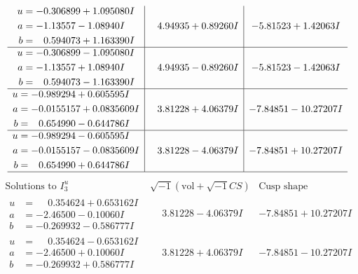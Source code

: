 \documentclass[1p]{elsarticle_modified}
\theoremstyle{definition}
\newcommand{\I}{\sqrt{-1}}
\begin{document}
$$\begin{array}{c|c|c}
\begin{aligned}
u &= -0.306899 + 1.095080 I \\
a &= -1.13557 - 1.08940 I \\
b &= \phantom{-}0.594073 + 1.163390 I\end{aligned}
 & \phantom{-}4.94935 + 0.89260 I & -5.81523 + 1.42063 I \\ \hline\begin{aligned}
u &= -0.306899 - 1.095080 I \\
a &= -1.13557 + 1.08940 I \\
b &= \phantom{-}0.594073 - 1.163390 I\end{aligned}
 & \phantom{-}4.94935 - 0.89260 I & -5.81523 - 1.42063 I \\ \hline\begin{aligned}
u &= -0.989294 + 0.605595 I \\
a &= -0.0155157 + 0.0835609 I \\
b &= \phantom{-}0.654990 - 0.644786 I\end{aligned}
 & \phantom{-}3.81228 + 4.06379 I & -7.84851 - 10.27207 I \\ \hline\begin{aligned}
u &= -0.989294 - 0.605595 I \\
a &= -0.0155157 - 0.0835609 I \\
b &= \phantom{-}0.654990 + 0.644786 I\end{aligned}
 & \phantom{-}3.81228 - 4.06379 I & -7.84851 + 10.27207 I\\
 \hline 
 \end{array}$$\newpage$$\begin{array}{c|c|c}  
\text{Solutions to }I^u_{3}& \I (\text{vol} + \sqrt{-1}CS) & \text{Cusp shape}\\
 \hline 
\begin{aligned}
u &= \phantom{-}0.354624 + 0.653162 I \\
a &= -2.46500 - 0.10060 I \\
b &= -0.269932 - 0.586777 I\end{aligned}
 & \phantom{-}3.81228 - 4.06379 I & -7.84851 + 10.27207 I \\ \hline\begin{aligned}
u &= \phantom{-}0.354624 - 0.653162 I \\
a &= -2.46500 + 0.10060 I \\
b &= -0.269932 + 0.586777 I\end{aligned}
 & \phantom{-}3.81228 + 4.06379 I & -7.84851 - 10.27207 I \\ \hline\begin{aligned}

\end{aligned}
\end{array}$$
\end{document}
